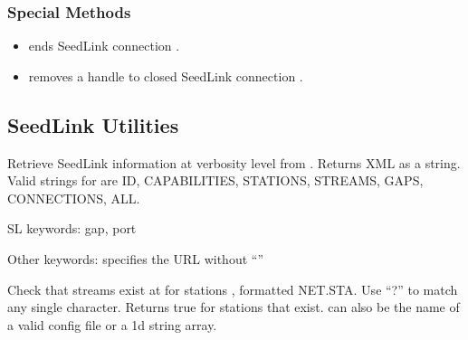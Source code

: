 \documentclass[letterpaper,11pt,english]{sphinxmanual}
\begin{document}
\subsubsection{Special Methods}
\label{\detokenize{src/Web/seedlink:special-methods}}\begin{itemize}
\item {} 
 ends SeedLink connection .

\item {} 
 removes a handle to closed SeedLink connection .

\end{itemize}


\subsection{SeedLink Utilities}
\label{\detokenize{src/Web/seedlink:seedlink-utilities}}

\begin{fulllineitems}
\label{\detokenize{src/Web/seedlink:SL_info}}
\end{fulllineitems}


Retrieve SeedLink information at verbosity level  from . Returns XML as a string. Valid strings for  are ID, CAPABILITIES, STATIONS, STREAMS, GAPS, CONNECTIONS, ALL.

\begin{fulllineitems}
\label{\detokenize{src/Web/seedlink:has_sta}}
\end{fulllineitems}


\begin{DUlineblock}{0em}
\item[] SL keywords: gap, port
\item[] Other keywords:  specifies the URL without “”
\end{DUlineblock}

Check that streams exist at  for stations , formatted
NET.STA. Use “?” to match any single character. Returns true for
stations that exist.  can also be the name of a valid config
file or a 1d string array.
\end{document}
